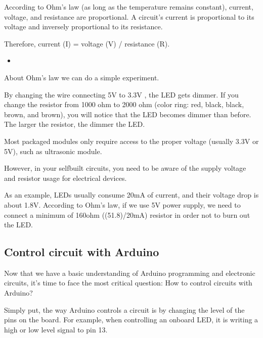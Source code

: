\documentclass[a4paper,11pt,english]{sphinxmanual}
\begin{document}
\sphinxAtStartPar
According to Ohm’s law (as long as the temperature remains constant), current, voltage, and resistance are proportional.
A circuit’s current is proportional to its voltage and inversely proportional to its resistance.

\sphinxAtStartPar
Therefore, current (I) = voltage (V) / resistance (R).
\begin{itemize}
\item {} 
\sphinxAtStartPar
{}

\end{itemize}

\sphinxAtStartPar
About Ohm’s law we can do a simple experiment.

\noindent{}

\sphinxAtStartPar
By changing the wire connecting 5V to 3.3V , the LED gets dimmer.
If you change the resistor from 1000 ohm to 2000 ohm (color ring: red, black, black, brown, and brown), you will notice that the LED becomes dimmer than before. The larger the resistor, the dimmer the LED.

\sphinxAtStartPar
Most packaged modules only require access to the proper voltage (usually 3.3V or 5V), such as ultrasonic module.

\sphinxAtStartPar
However, in your self\sphinxhyphen{}built circuits, you need to be aware of the supply voltage and resistor usage for electrical devices.

\sphinxAtStartPar
As an example, LEDs usually consume 20mA of current, and their voltage drop is about 1.8V. According to Ohm’s law, if we use 5V power supply, we need to connect a minimum of 160ohm ((5\sphinxhyphen{}1.8)/20mA) resistor in order not to burn out the LED.


\subsection{Control circuit with Arduino}
\label{\detokenize{Get_Started_with_Arduino/How_to_Build_the_Circuit:control-circuit-with-arduino}}
\sphinxAtStartPar
Now that we have a basic understanding of Arduino programming and electronic circuits, it’s time to face the most critical question: How to control circuits with Arduino?

\sphinxAtStartPar
Simply put, the way Arduino controls a circuit is by changing the level of the pins on the board. For example, when controlling an on\sphinxhyphen{}board LED, it is writing a high or low level signal to pin 13.
\end{document}
